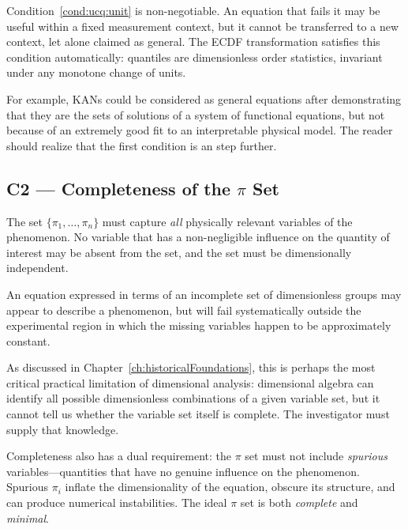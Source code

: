Condition~\ref{cond:ucq:unit} is non-negotiable.  An equation
that fails it may be useful within a fixed measurement context, but
it cannot be transferred to a new context, let alone claimed as
general.  The ECDF transformation satisfies this condition
automatically: quantiles are dimensionless order statistics,
invariant under any monotone change of units.

For example, KANs could be considered as general equations after demonstrating that they are the sets of solutions of a system of functional equations, but not because of an extremely good fit to an interpretable physical model. The reader should realize that the first condition is an step further.

\subsection{C2 --- Completeness of the $\pi$ Set}

\begin{condbox}
\begin{condition}
  \label{cond:ucq:complete}
The set $\{\pi_1,\ldots,\pi_n\}$ must capture \emph{all}
physically relevant variables of the phenomenon.  No variable
that has a non-negligible influence on the quantity of interest
may be absent from the set, and the set must be dimensionally
independent.
\end{condition}
\end{condbox}

An equation expressed in terms of an incomplete set of
dimensionless groups may appear to describe a phenomenon, but will
fail systematically outside the experimental region in which the
missing variables happen to be approximately constant.

As discussed in Chapter~\ref{ch:historicalFoundations}, this is
perhaps the most critical practical limitation of dimensional
analysis: dimensional algebra can identify all possible
dimensionless combinations of a given variable set, but it cannot
tell us whether the variable set itself is complete.  The
investigator must supply that knowledge.

Completeness also has a dual requirement: the $\pi$ set must not
include \emph{spurious} variables---quantities that have no genuine
influence on the phenomenon.  Spurious $\pi_i$ inflate the
dimensionality of the equation, obscure its structure, and can
produce numerical instabilities.  The ideal $\pi$ set is both
\emph{complete} and \emph{minimal}.

